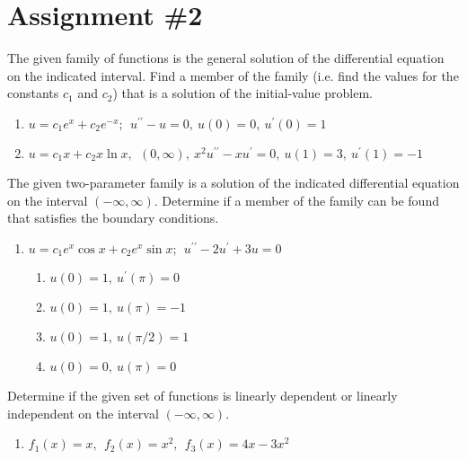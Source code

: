 \chapter{Assignment \#2}
\label{ch:ass2}
\begin{fullwidth}
The given family of functions is the general solution of the differential equation on the indicated interval.  Find a member of the family (i.e. find the values for the constants $c_1$ and $c_2$) that is a solution of the initial-value problem.

\begin{enumerate}[series=outerlist]
\item $u=c_1e^{x}+c_2e^{-x}; \ \ u^{\prime \prime}-u=0, \ u(0)=0, \ u^{\prime}(0)=1$

\vspace{1.0cm}

\item $u=c_1x + c_2x \ln{x}, \ \ (0,\infty), \ x^2u^{\prime \prime}-xu^{\prime}=0, \ u(1)=3, \ u^{\prime}(1)=-1$

\vspace{1.0cm}
\end{enumerate}

\noindent The given two-parameter family is a solution of the indicated differential equation on the interval $(-\infty,\infty)$.  Determine if a member of the family can be found that satisfies the boundary conditions.

\begin{enumerate}[resume=outerlist]
\item $u=c_1e^{x}\cos{x} + c_2e^{x}\sin{x}; \ \ u^{\prime \prime}-2u^{\prime}+3u=0$

\begin{enumerate}[series=innerlist]
\item $u(0)=1, \ u^{\prime}(\pi)=0$

\item $u(0)=1, \ u(\pi)=-1$

\item $u(0)=1, \ u(\pi/2)=1$

\item $u(0)=0, \ u(\pi)=0$
\end{enumerate}

\vspace{1.0cm}
\end{enumerate}
Determine if the given set of functions is linearly dependent or linearly independent on the interval $(-\infty,\infty)$.


\begin{enumerate}[resume=outerlist]
\item $f_1(x)=x, \ \ f_2(x)=x^2, \ \ f_3(x)=4x-3x^2$


\end{enumerate}
\end{fullwidth}
